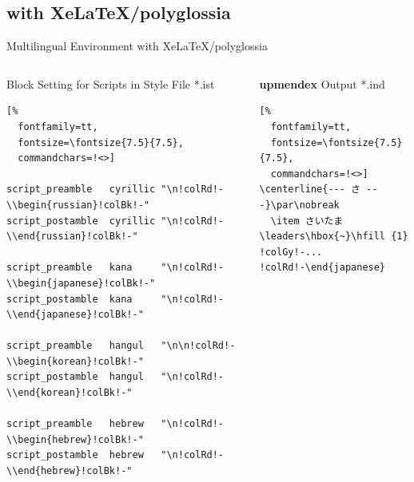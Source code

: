 \documentclass[aspectratio=169,10pt]{beamer}
\begin{document}

\subsection{with XeLaTeX/polyglossia}
\begin{frame}[fragile]{Multilingual Environment with XeLaTeX/polyglossia}
\begin{columns}
\begin{column}{72mm}
\begin{exampleblock}{Block Setting for Scripts in Style File *.ist}
\setmonofont{Noto Sans Mono CJK JP}
\begin{Verbatim}[%
  fontfamily=tt,
  fontsize=\fontsize{7.5}{7.5},
  commandchars=!<>]

script_preamble   cyrillic "\n!colRd!-\\begin{russian}!colBk!-"
script_postamble  cyrillic "\n!colRd!-\\end{russian}!colBk!-"

script_preamble   kana     "\n!colRd!-\\begin{japanese}!colBk!-"
script_postamble  kana     "\n!colRd!-\\end{japanese}!colBk!-"

script_preamble   hangul   "\n\n!colRd!-\\begin{korean}!colBk!-"
script_postamble  hangul   "\n!colRd!-\\end{korean}!colBk!-"

script_preamble   hebrew   "\n!colRd!-\\begin{hebrew}!colBk!-"
script_postamble  hebrew   "\n!colRd!-\\end{hebrew}!colBk!-"

\end{Verbatim}
\end{exampleblock}
\end{column}

\begin{column}{64mm}
\vspace{-2mm}
\begin{exampleblock}{\textbf{upmendex} Output *.ind}
\setmonofont{Noto Sans Mono CJK JP}
\begin{Verbatim}[%
  fontfamily=tt,
  fontsize=\fontsize{7.5}{7.5},
  commandchars=!<>]
\centerline{--- さ ---}\par\nobreak
  \item さいたま\leaders\hbox{~}\hfill {1}
!colGy!-...
!colRd!-\end{japanese}


\end{Verbatim}
\end{exampleblock}
\end{column}
\end{columns}
\end{frame}
\end{document}
